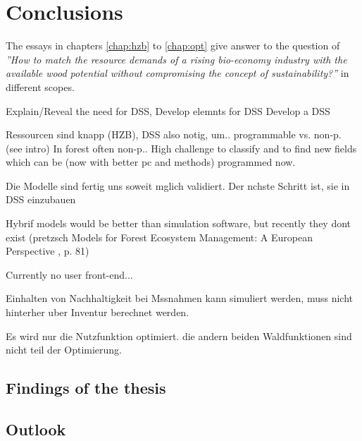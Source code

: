 \chapter{Conclusions}
\label{chap:discussion}
The essays in chapters \ref{chap:hzb} to \ref{chap:opt} give answer to the question of \textit{''How to match the resource demands of a rising bio-economy industry with the available wood potential without compromising the concept of sustainability?''} in different scopes.

Explain/Reveal the need for DSS, 
Develop elemnts for DSS
Develop a DSS

Ressourcen sind knapp (HZB), DSS also notig, um..
programmable vs. non-p. (see intro) In forest often non-p.. High challenge to classify and to find new fields which can be (now with better pc and methods) programmed now.

Die Modelle sind fertig uns soweit mglich validiert. Der nchste Schritt ist, sie in DSS einzubauen

Hybrif models would be better than simulation software, but recently they dont exist (pretzsch Models for Forest Ecosystem Management: A European Perspective
, p. 81)

Currently no user front-end...

Einhalten von Nachhaltigkeit bei Mssnahmen kann simuliert werden, muss nicht hinterher uber Inventur berechnet werden.

Es wird nur die Nutzfunktion optimiert. die andern beiden Waldfunktionen sind nicht teil der Optimierung.
\section{Findings of the thesis}
\label{sec:discussion:findings}
\section{Outlook}
\label{sec:discussion:outlook}